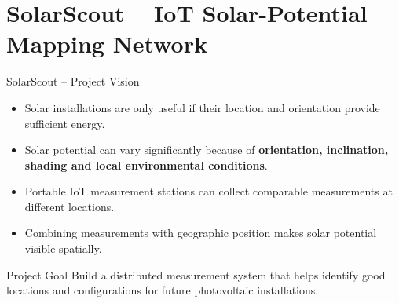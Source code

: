 \section[nosectionpage]{SolarScout -- IoT Solar-Potential Mapping Network}

\begin{frame}{SolarScout -- Project Vision}
\begin{itemize}
    \item Solar installations are only useful if their location and orientation provide sufficient energy.
    \item Solar potential can vary significantly because of \textbf{orientation, inclination, shading and local environmental conditions}.
    \item Portable IoT measurement stations can collect comparable measurements at different locations.
    \item Combining measurements with geographic position makes solar potential visible spatially.
\end{itemize}

\begin{block}{Project Goal}
Build a distributed measurement system that helps identify good locations and configurations for future photovoltaic installations.
\end{block}
\end{frame}
